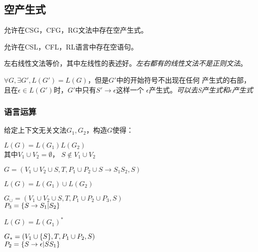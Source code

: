 \documentclass[twocolumn,zihao=5,linespread=1,heading=false,autoindent=0pt]{ctexart}
\DeclarePairedDelimiter{\set}{\{}{\}}
\DeclarePairedDelimiter{\paren}{(}{)}
\theoremstyle{exampstyle} \newtheorem{definition}{定义}[section]
\theoremstyle{exampstyle} \newtheorem{example}{例}[section]
\theoremstyle{exampstyle} \newtheorem{theorem}{定理}[section]
\theoremstyle{exampstyle} \newtheorem{lemma}{引理}[section]
\theoremstyle{exampstyle} \newtheorem{myproof}{证明}[section]
\begin{document}
\subsection{空产生式}
允许在CSG，CFG，RG文法中存在空产生式。 

允许在CSL，CFL，RL语言中存在空语句。

左右线性文法等价，其中左线性的表述好。\emph{左右都有的线性文法不是正则文法}。

$\forall G, \exists G', L(G') = L(G)$，但是$G'$中的开始符号不出现在任何
    产生式的右部，且在$\epsilon \in L(G')$时，$G'$中只有$S' \to \epsilon$这样一个
    $\epsilon$产生式。\emph{可以去S产生式和$\epsilon$产生式}

\subsubsection{语言运算}
给定上下文无关文法$G_1,G_2$，构造$G$使得：
\begin{outline}[cenumerate]
    \1 $L(G) = L(G_1)L(G_2)$ \\
        其中$V_1 \cup V_2 = \emptyset$， $S \notin V_1 \cup V_2$

        $G = (V_1 \cup V_2 \cup {S}, T, P_1 \cup P_2 \cup {S \to S_1S_2}, S)$

    \1 $L(G) = L(G_1) \cup L(G_2)$

        $G_\cup = (V_1 \cup V_2 \cup {S}, T, P_1 \cup P_2 \cup P_3, S)$ \\
        $P_3 = \set*{S \to S_1 | S_2}$

    \1 $L(G) = L(G_1)^*$

        $G_* = \paren*{V_1 \cup \set*{S}, T, P_1 \cup P_2, S}$ \\
        $P_2 = \set*{S \to \epsilon | SS_1}$

\end{outline}
\end{document}
